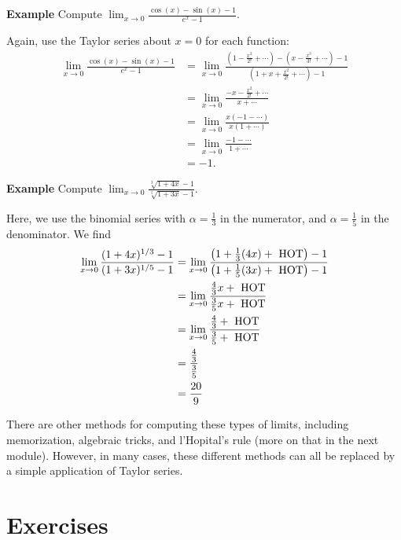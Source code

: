 \documentclass[twoside,openright,titlepage,a4paper]{book}
\begin{document}
\begin{sloppypar}
\textbf{Example} Compute $\displaystyle \lim_{x\rightarrow 0} \frac{\cos(x)-\sin(x)-1}{e^x-1}$. 
\begin{examplebox}
Again, use the Taylor series about $x=0$ for each function: 
\begin{align*}
\lim_{x \rightarrow 0} \frac{\cos(x)-\sin(x)-1}{e^x-1} &= \lim_{x \rightarrow 0} \frac{(1-\frac{x^2}{2!}+\dotsb)-(x-\frac{x^3}{3!}+\dotsb)-1}{(1+x+\frac{x^2}{2!}+\dotsb)-1} \\
&= \lim_{x\rightarrow 0}\frac{-x-\frac{x^2}{2!}+\dotsb}{x+\dotsb} \\
&= \lim_{x \rightarrow 0} \frac{x(-1-\dotsb)}{x(1+\dotsb)} \\
&= \lim_{x \rightarrow 0} \frac{-1-\dotsb}{1+\dotsb} \\
&= -1.
\end{align*}
\end{examplebox}

\textbf{Example} Compute $\displaystyle \lim_{x \rightarrow 0} \frac{\sqrt[3]{1+4x} - 1}{\sqrt[5]{1+3x} - 1}$.
\begin{examplebox}
Here, we use the binomial series with $\alpha = \frac{1}{3}$ in the numerator, and $\alpha = \frac{1}{5}$ in the denominator. We find
\begin{align*}
\lim_{x \rightarrow 0} \frac{(1+4x)^{1/3}- 1}{(1+3x)^{1/5} - 1} &= \lim_{x \rightarrow 0} \frac{\left(1+\frac{1}{3}(4x) + \hbox{ HOT}\right)-1}{\left(1+\frac{1}{5}(3x) + \hbox{ HOT}\right) - 1} \\
&= \lim_{x \rightarrow 0} \frac{\frac{4}{3}x + \hbox{ HOT}}{\frac{3}{5}x + \hbox{ HOT}} \\
&= \lim_{x \rightarrow 0} \frac{\frac{4}{3} + \hbox{ HOT}}{\frac{3}{5} + \hbox{ HOT}} \\
&= \frac{\frac{4}{3}}{\frac{3}{5}} \\
& = \frac{20}{9}
\end{align*}
\end{examplebox}

There are other methods for computing these types of limits, including memorization, algebraic tricks, and l'Hopital's rule (more on that in the next module). However, in many cases, these different methods can all be replaced by a simple application of Taylor series.

\section{Exercises}


\end{sloppypar}
\end{document}
